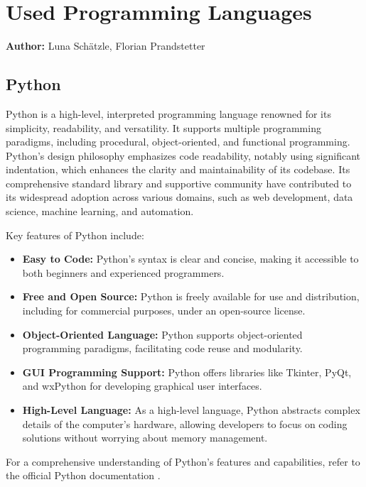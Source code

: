 
\chapter{Used Programming Languages}
\label{chap:used_programming_languages}
\textbf{Author:} Luna Schätzle, Florian Prandstetter

\section{Python}

Python is a high-level, interpreted programming language renowned for its simplicity, readability, and versatility. It supports multiple programming paradigms, including procedural, object-oriented, and functional programming. Python's design philosophy emphasizes code readability, notably using significant indentation, which enhances the clarity and maintainability of its codebase. Its comprehensive standard library and supportive community have contributed to its widespread adoption across various domains, such as web development, data science, machine learning, and automation.

Key features of Python include:

\begin{itemize}
    \item \textbf{Easy to Code:} Python's syntax is clear and concise, making it accessible to both beginners and experienced programmers.
    \item \textbf{Free and Open Source:} Python is freely available for use and distribution, including for commercial purposes, under an open-source license.
    \item \textbf{Object-Oriented Language:} Python supports object-oriented programming paradigms, facilitating code reuse and modularity.
    \item \textbf{GUI Programming Support:} Python offers libraries like Tkinter, PyQt, and wxPython for developing graphical user interfaces.
    \item \textbf{High-Level Language:} As a high-level language, Python abstracts complex details of the computer's hardware, allowing developers to focus on coding solutions without worrying about memory management.
\end{itemize}

For a comprehensive understanding of Python's features and capabilities, refer to the official Python documentation \cite{pythonDocumentation}.

